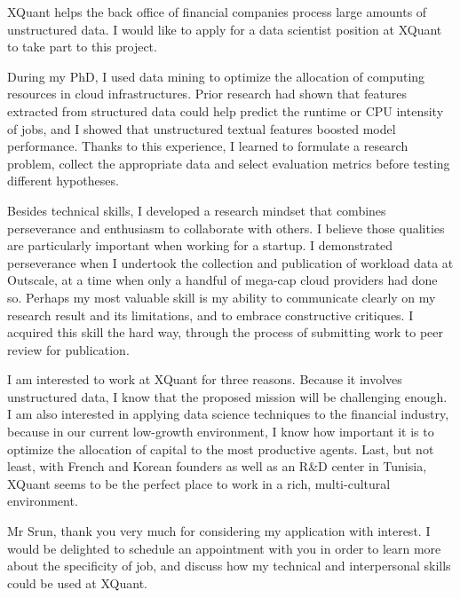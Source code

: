 XQuant helps the back office of financial companies process large amounts of unstructured data. 
I would like to apply for a data scientist position at XQuant to take part to this project. 

During my PhD, I used data mining to optimize the allocation of computing resources in cloud infrastructures. 
Prior research had shown that features extracted from structured data could help predict the runtime or CPU intensity of jobs, and I showed that unstructured textual features boosted model performance. Thanks to this experience, I learned to formulate a research problem, collect the appropriate data and select evaluation metrics before testing different hypotheses. 

Besides technical skills, I developed a research mindset that combines perseverance and enthusiasm to collaborate with others. I believe those qualities are particularly important when working for a startup.  
I demonstrated perseverance when I undertook the collection and publication of workload data at Outscale, at a time when only a handful of mega-cap cloud providers had done so. 
Perhaps my most valuable skill is my ability to communicate clearly on my research result and its limitations, and to embrace constructive critiques. 
I acquired this skill the hard way, through the process of submitting work to peer review for publication. 

I am interested to work at XQuant for three reasons. Because it involves unstructured data, I know that the proposed mission will be challenging enough. 
I am also interested in applying data science techniques to the financial industry, because in our current low-growth environment, I know how important it is to optimize the allocation of capital to the most productive agents. Last, but not least, with French and Korean founders as well as an R\&D center in Tunisia, XQuant seems to be the perfect place to work in a rich, multi-cultural environment. 


Mr Srun, thank you very much for considering my application with interest. 
I would be delighted to schedule an appointment with you in order to learn more about the specificity of job, and discuss how my technical and interpersonal skills could be used at XQuant.  
